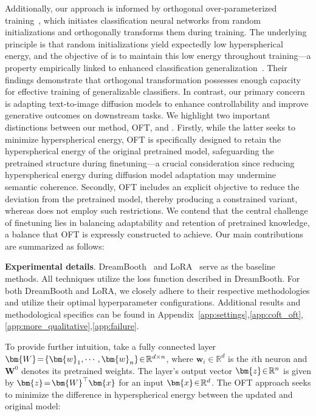 Additionally, our approach is informed by orthogonal over-parameterized training~\cite{liu2021orthogonal}, which initiates classification neural networks from random initializations and orthogonally transforms them during training. The underlying principle is that random initializations yield expectedly low hyperspherical energy, and the objective of \cite{liu2021orthogonal} is to maintain this low energy throughout training—a property empirically linked to enhanced classification generalization~\cite{liu2018learning,lin2020regularizing}. Their findings demonstrate that orthogonal transformation possesses enough capacity for effective training of generalizable classifiers. In contrast, our primary concern is adapting text-to-image diffusion models to enhance controllability and improve generative outcomes on downstream tasks. We highlight two important distinctions between our method, OFT, and \cite{liu2021orthogonal}. Firstly, while the latter seeks to minimize hyperspherical energy, OFT is specifically designed to retain the hyperspherical energy of the original pretrained model, safeguarding the pretrained structure during finetuning—a crucial consideration since reducing hyperspherical energy during diffusion model adaptation may undermine semantic coherence. Secondly, OFT includes an explicit objective to reduce the deviation from the pretrained model, thereby producing a constrained variant, whereas \cite{liu2021orthogonal} does not employ such restrictions. We contend that the central challenge of finetuning lies in balancing adaptability and retention of pretrained knowledge, a balance that OFT is expressly constructed to achieve. Our main contributions are summarized as follows:

\textbf{Experimental details}. DreamBooth~\cite{ruiz2023dreambooth} and LoRA~\cite{hulora2022} serve as the baseline methods. All techniques utilize the loss function described in DreamBooth. For both DreamBooth and LoRA, we closely adhere to their respective methodologies and utilize their optimal hyperparameter configurations. Additional results and methodological specifics can be found in Appendix~\ref{app:settings},\ref{app:coft_oft},\ref{app:more_qualitative},\ref{app:failure}.

To provide further intuition, take a fully connected layer $\thickmuskip=2mu \medmuskip=2mu \bm{W}=\{\bm{w}_1,\cdots,\bm{w}_n\}\in\mathbb{R}^{d\times n}$, where $\bm{w}_i\in\mathbb{R}^{d}$ is the $i$th neuron and $\bm{W}^0$ denotes its pretrained weights. The layer's output vector $\thickmuskip=2mu \medmuskip=2mu \bm{z}\in\mathbb{R}^n$ is given by $\thickmuskip=2mu \medmuskip=2mu \bm{z}=\bm{W}^\top\bm{x}$ for an input $\thickmuskip=2mu \medmuskip=2mu \bm{x}\in\mathbb{R}^d$. The OFT approach seeks to minimize the difference in hyperspherical energy between the updated and original model:


